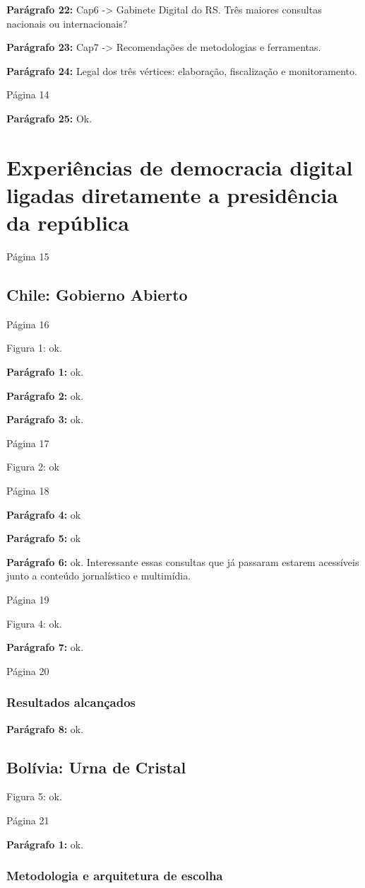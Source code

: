 \documentclass[12pt]{report}
\newcommand{\pp}[1]{

\textbf{Parágrafo #1:}
}
\begin{document}
\pp{22} Cap6 -> Gabinete Digital do RS. Três maiores consultas nacionais ou internacionais?

\pp{23} Cap7 -> Recomendações de metodologias e ferramentas.

\pp{24} Legal dos três vértices: elaboração, fiscalização e monitoramento.

\noindent Página 14 

\pp{25} Ok.

\section{Experiências de democracia digital ligadas
diretamente a presidência da república}
Página 15
\subsection{Chile: Gobierno Abierto}
Página 16

Figura 1: ok.

\pp{1} ok.

\pp{2} ok.

\pp{3} ok.

\noindent Página 17

Figura 2: ok

\noindent Página 18

\pp{4} ok

\pp{5} ok

\pp{6} ok. Interessante essas consultas que já passaram estarem acessíveis junto a conteúdo jornalístico e multimídia.

\noindent Página 19

Figura 4: ok.

\pp{7} ok.

\noindent Página 20

\subsubsection{Resultados alcançados}

\pp{8} ok.

\subsection{Bolívia: Urna de Cristal}

\indent Figura 5: ok.

\noindent Página 21

\pp{1} ok.

\subsubsection{Metodologia e arquitetura de escolha}
\end{document}
